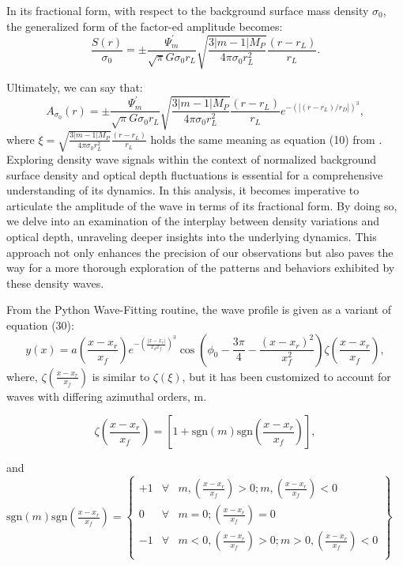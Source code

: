 \documentclass{article}
\begin{document}
In its fractional form, with respect to the background surface mass density $\sigma_{0}$, the generalized form of the factor-ed amplitude becomes:
\begin{equation}
   \frac{S(r)}{\sigma_{0}} = \pm \frac{\Psi_{m}^{'}}{\sqrt{\pi}G\sigma_{0} r_{L}} \sqrt{\frac{3|m - 1|M_{P}}{4 \pi \sigma_{0}r_{L}^{2}}} \frac{(r - r_{L})}{r_{L}}.
\end{equation}

Ultimately, we can say that:
\begin{equation}
  A_{\sigma_{0}}(r) = \pm \frac{\Psi_{m}^{'}}{\sqrt{\pi}G\sigma_{0} r_{L}} \sqrt{\frac{3|m - 1|M_{P}}{4 \pi \sigma_{0}r_{L}^{2}}} \frac{(r - r_{L})}{r_{L}}e^{-(|(r - r_{L})/r_{D}|)^{3}},
\end{equation}
where $\xi = \sqrt{\frac{3|m - 1|M_{P}}{4 \pi \sigma_{0}r_{L}^{2}}}\frac{(r - r_{L})}{r_{L}}$ holds the same meaning as equation (10) from \cite{Nicholson1990AnAR}. Exploring density wave signals within the context of normalized background surface density and optical depth fluctuations is essential for a comprehensive understanding of its dynamics. In this analysis, it becomes imperative to articulate the amplitude of the wave in terms of its fractional form. By doing so, we delve into an examination of the interplay between density variations and optical depth, unraveling deeper insights into the underlying dynamics. This approach not only enhances the precision of our observations but also paves the way for a more thorough exploration of the patterns and behaviors exhibited by these density waves.


From the Python Wave-Fitting routine, the wave profile is given as a variant of equation (30):
\begin{equation}
    y(x) = a(\frac{x-x_{r}}{x_{f}})e^{-\left(\frac{|x-x_{r}|}{x_{d}x_{f}}\right)^{3}}\cos\left(\phi_{0} - \frac{3\pi}{4} - \frac{{(x-x_{r})^2}}{{x_{f}^{2}}}\right)\zeta(\frac{x-x_{r}}{x_{f}}), 
\end{equation}
where,  $\zeta(\frac{x-x_{r}}{x_{f}})$ is similar to  $\zeta(\xi)$, but it has been customized to account for waves with differing azimuthal orders, m.            

\begin{equation}
\zeta(\frac{x-x_{r}}{x_{f}}) = [1 + \mathrm{sgn}(m) \mathrm{sgn}(\frac{x-x_{r}}{x_{f}})],
\end{equation}

and $\mathrm{sgn}(m) \mathrm{sgn}(\frac{x-x_{r}}{x_{f}}) = \left\{ \begin{array}{rcl}
+1 & \forall & m, (\frac{x-x_{r}}{x_{f}}) >0;  m, (\frac{x-x_{r}}{x_{f}}) <0  \\ 0 & \forall & m =0; (\frac{x-x_{r}}{x_{f}}) = 0 \\ -1 & \forall & m<0, (\frac{x-x_{r}}{x_{f}}) >0; m>0, (\frac{x-x_{r}}{x_{f}}) <0 \\ 
\end{array} \right\}$
\end{document}
